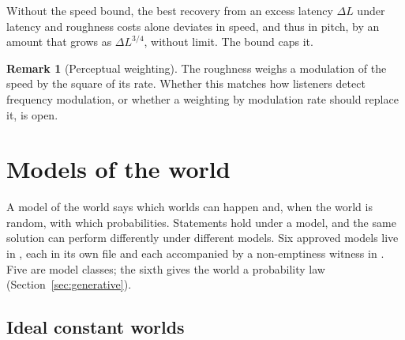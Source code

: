 \documentclass[11pt,a4paper]{article}
\theoremstyle{definition}
\newtheorem{remark}[definition]{Remark}
\begin{document}
Without the speed bound, the best recovery from an excess latency
$\Delta L$ under latency and roughness costs alone deviates in speed, and
thus in pitch, by an amount that grows as $\Delta L^{3/4}$, without limit.
The bound caps it.

\begin{remark}[Perceptual weighting]
The roughness weighs a modulation of the speed by the square of its rate.
Whether this matches how listeners detect frequency modulation, or whether
a weighting by modulation rate should replace it, is open.
\end{remark}

\section{Models of the world}\label{sec:models}

A model of the world says which worlds can happen and, when the world is
random, with which probabilities. Statements hold under a model, and the
same solution can perform differently under different models. Six approved
models live in , each in its own file and
each accompanied by a non-emptiness witness in
. Five are model classes; the sixth
gives the world a probability law (Section~\ref{sec:generative}).

\subsection{Ideal constant worlds}
\end{document}
